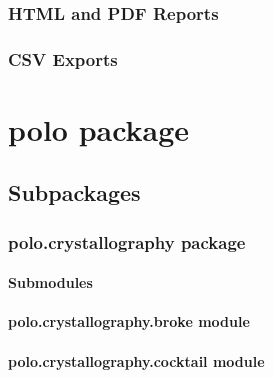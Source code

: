 \documentclass[letterpaper,10pt,english]{sphinxmanual}
\begin{document}
\subsection{HTML and PDF Reports}
\label{\detokenize{user_guide:html-and-pdf-reports}}

\subsection{CSV Exports}
\label{\detokenize{user_guide:csv-exports}}

\chapter{polo package}
\label{\detokenize{polo:polo-package}}\label{\detokenize{polo::doc}}

\section{Subpackages}
\label{\detokenize{polo:subpackages}}

\subsection{polo.crystallography package}
\label{\detokenize{polo.crystallography:polo-crystallography-package}}\label{\detokenize{polo.crystallography::doc}}

\subsubsection{Submodules}
\label{\detokenize{polo.crystallography:submodules}}

\subsubsection{polo.crystallography.broke module}
\label{\detokenize{polo.crystallography:module-polo.crystallography.broke}}\label{\detokenize{polo.crystallography:polo-crystallography-broke-module}}

\subsubsection{polo.crystallography.cocktail module}
\label{\detokenize{polo.crystallography:module-polo.crystallography.cocktail}}\label{\detokenize{polo.crystallography:polo-crystallography-cocktail-module}}
\end{document}
